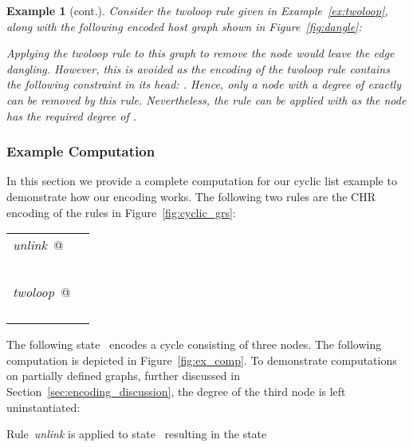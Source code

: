 \documentclass{tlp}
\newtheorem{example}{Example}[section]
\begin{document}
\begin{example}[cont.] Consider the \emph{twoloop} rule given in
Example~\ref{ex:twoloop}, along with the following encoded host graph shown in
Figure~\ref{fig:dangle}:


Applying the \emph{twoloop} rule to this graph to remove the node  would
leave the edge~ dangling. However, this is avoided as the encoding of the
\emph{twoloop} rule contains the following constraint in its head: . Hence, only a node with a degree of exactly  can be removed by this rule.
Nevertheless, the rule can be applied with  as the node  has the
required degree of .
\end{example}

\subsubsection{Example Computation}
\label{sec:encoding_example}

In this section we provide a complete computation for our cyclic list example to
demonstrate how our encoding works. The following two rules are the CHR encoding
of the rules in Figure~\ref{fig:cyclic_grs}:

\begin{center} 
\begin{tabular}{ll}
\emph{unlink}\ @ & \\
				& \\
                & \\
                & \\
                & \\
                &\\
\emph{twoloop}\ @ &  \\
				 &  \\
				 &  \\
				 & \\
				 & 
\end{tabular}
\end{center}

The following state~ encodes a cycle consisting of three nodes. The
following computation is depicted in Figure~\ref{fig:ex_comp}. To demonstrate
computations on partially defined graphs, further discussed in
Section~\ref{sec:encoding_discussion}, the degree of the third node is left
uninstantiated:



Rule~\emph{unlink} is applied to state~ resulting in the state
\end{document}
